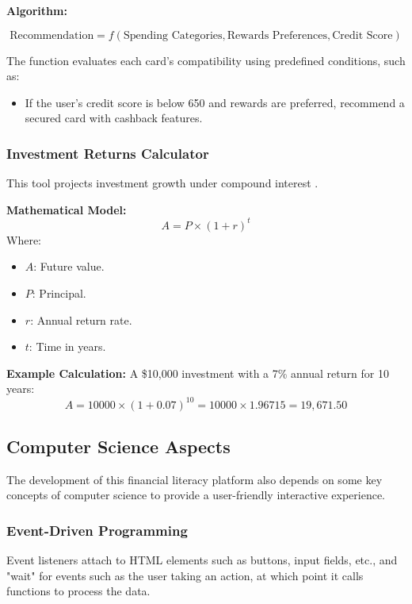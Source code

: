 \documentclass[11pt,twocolumn]{article}
\begin{document}
\textbf{Algorithm:}
  {\normalsize
\[

\text{Recommendation} = f(\text{Spending Categories}, \text{Rewards Preferences}, \text{Credit Score})
\]

}

\vspace{0.5cm}
The function evaluates each card’s compatibility using predefined conditions, such as:
\begin{itemize}
    \item If the user’s credit score is below 650 and rewards are preferred, recommend a secured card with cashback features.
\end{itemize}

\subsubsection{Investment Returns Calculator}
This tool projects investment growth under compound interest \cite{compoundinterest}.

\textbf{Mathematical Model:}
\[
A = P \times (1 + r)^t
\]
Where:
\begin{itemize}
    \item \( A \): Future value.
    \item \( P \): Principal.
    \item \( r \): Annual return rate.
    \item \( t \): Time in years.
\end{itemize}

\textbf{Example Calculation:}  
A \$10,000 investment with a 7\% annual return for 10 years:
{\small
\[
A = 10000 \times (1 + 0.07)^{10} = 10000 \times 1.96715 = 19,671.50
\]
}


\subsection{Computer Science Aspects}

The development of this financial literacy platform also depends on some key concepts of computer science to provide a user-friendly interactive experience.

\subsubsection{Event-Driven Programming}
Event listeners attach to HTML elements such as buttons, input fields, etc., and "wait" for events such as the user taking an action, at which point it calls functions to process the data. 
\end{document}
